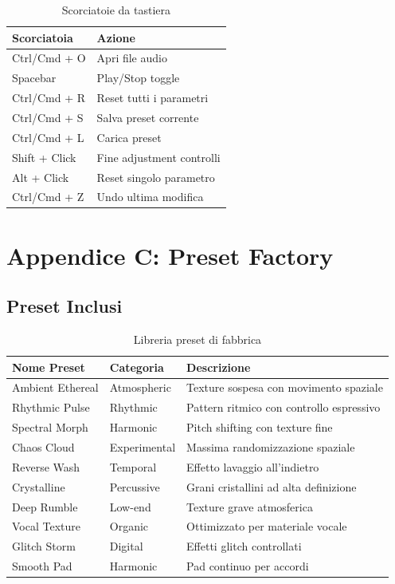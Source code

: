 \documentclass[a4paper,11pt,openany]{book}
\begin{document}
\begin{table}[H]
    \centering
    \caption{Scorciatoie da tastiera}
    \label{tab:keyboard_shortcuts}
    \begin{tabular}{@{}p{4cm}p{8cm}@{}}
        \toprule
        \textbf{Scorciatoia} & \textbf{Azione} \\
        \midrule
        Ctrl/Cmd + O & Apri file audio \\
        Spacebar & Play/Stop toggle \\
        Ctrl/Cmd + R & Reset tutti i parametri \\
        Ctrl/Cmd + S & Salva preset corrente \\
        Ctrl/Cmd + L & Carica preset \\
        Shift + Click & Fine adjustment controlli \\
        Alt + Click & Reset singolo parametro \\
        Ctrl/Cmd + Z & Undo ultima modifica \\
        \bottomrule
    \end{tabular}
\end{table}

\section*{Appendice C: Preset Factory}

\subsection*{Preset Inclusi}

\begin{table}[H]
    \centering
    \caption{Libreria preset di fabbrica}
    \label{tab:factory_presets}
    \begin{tabular}{@{}p{3cm}p{3cm}p{6cm}@{}}
        \toprule
        \textbf{Nome Preset} & \textbf{Categoria} & \textbf{Descrizione} \\
        \midrule
        Ambient Ethereal & Atmospheric & Texture sospesa con movimento spaziale \\
        Rhythmic Pulse & Rhythmic & Pattern ritmico con controllo espressivo \\
        Spectral Morph & Harmonic & Pitch shifting con texture fine \\
        Chaos Cloud & Experimental & Massima randomizzazione spaziale \\
        Reverse Wash & Temporal & Effetto lavaggio all'indietro \\
        Crystalline & Percussive & Grani cristallini ad alta definizione \\
        Deep Rumble & Low-end & Texture grave atmosferica \\
        Vocal Texture & Organic & Ottimizzato per materiale vocale \\
        Glitch Storm & Digital & Effetti glitch controllati \\
        Smooth Pad & Harmonic & Pad continuo per accordi \\
        \bottomrule
    \end{tabular}
\end{table}
\end{document}
